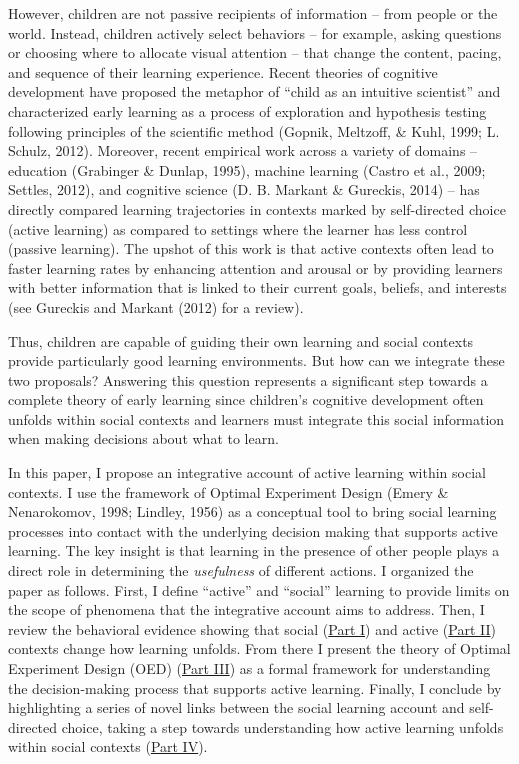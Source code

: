 \documentclass[english,floatsintext,man]{apa6}
\theoremstyle{definition}
\theoremstyle{definition}
\theoremstyle{definition}
\theoremstyle{remark}
\begin{document}
However, children are not passive recipients of information -- from
people or the world. Instead, children actively select behaviors -- for
example, asking questions or choosing where to allocate visual attention
-- that change the content, pacing, and sequence of their learning
experience. Recent theories of cognitive development have proposed the
metaphor of \enquote{child as an intuitive scientist} and characterized
early learning as a process of exploration and hypothesis testing
following principles of the scientific method (Gopnik, Meltzoff, \&
Kuhl, 1999; L. Schulz, 2012). Moreover, recent empirical work across a
variety of domains -- education (Grabinger \& Dunlap, 1995), machine
learning (Castro et al., 2009; Settles, 2012), and cognitive science (D.
B. Markant \& Gureckis, 2014) -- has directly compared learning
trajectories in contexts marked by self-directed choice (active
learning) as compared to settings where the learner has less control
(passive learning). The upshot of this work is that active contexts
often lead to faster learning rates by enhancing attention and arousal
or by providing learners with better information that is linked to their
current goals, beliefs, and interests (see Gureckis and Markant (2012)
for a review).

Thus, children are capable of guiding their own learning and social
contexts provide particularly good learning environments. But how can we
integrate these two proposals? Answering this question represents a
significant step towards a complete theory of early learning since
children's cognitive development often unfolds within social contexts
and learners must integrate this social information when making
decisions about what to learn.

In this paper, I propose an integrative account of active learning
within social contexts. I use the framework of Optimal Experiment Design
(Emery \& Nenarokomov, 1998; Lindley, 1956) as a conceptual tool to
bring social learning processes into contact with the underlying
decision making that supports active learning. The key insight is that
learning in the presence of other people plays a direct role in
determining the \emph{usefulness} of different actions. I organized the
paper as follows. First, I define \enquote{active} and \enquote{social}
learning to provide limits on the scope of phenomena that the
integrative account aims to address. Then, I review the behavioral
evidence showing that social (\protect\hyperlink{p1}{Part I}) and active
(\protect\hyperlink{p2}{Part II}) contexts change how learning unfolds.
From there I present the theory of Optimal Experiment Design (OED)
(\protect\hyperlink{p3}{Part III}) as a formal framework for
understanding the decision-making process that supports active learning.
Finally, I conclude by highlighting a series of novel links between the
social learning account and self-directed choice, taking a step towards
understanding how active learning unfolds within social contexts
(\protect\hyperlink{p4}{Part IV}).
\end{document}
